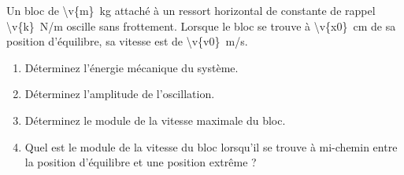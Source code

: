 Un bloc de \qty{\v{m}}{kg} attaché à un ressort horizontal de constante de rappel \qty{\v{k}}{N/m} oscille sans frottement. Lorsque le bloc se trouve à \qty{\v{x0}}{cm} de sa position d'équilibre, sa vitesse est de \qty{\v{v0}}{m/s}.

\begin{enumerate}[label=\alph*)]
    \item Déterminez l'énergie mécanique du système.
    \item Déterminez l'amplitude de l'oscillation.
    \item Déterminez le module de la vitesse maximale du bloc.
    \item Quel est le module de la vitesse du bloc lorsqu'il se trouve à mi-chemin entre la position d'équilibre et une position extrême ?
\end{enumerate}
